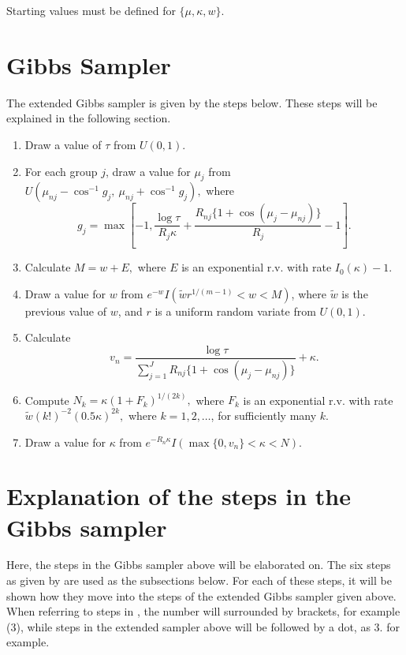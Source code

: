 \documentclass[12pt,a4paper]{article}
\begin{document}
Starting values must be defined for $\{\mu, \kappa, w\}$.

\section{Gibbs Sampler}

The extended Gibbs sampler is given by the steps below. These steps will be explained in the following section.

\begin{enumerate}
\item  Draw a value of $\tau$ from $U(0, 1)$. 

\item  For each group $j$, draw a value for $\mu_j$ from $U(\mu_{nj} - \cos^{-1}g_j,~ \mu_{nj} + \cos^{-1}g_j),$ where $$ g_j=\max\left[-1, \frac{\log \tau}{R_j \kappa} + \frac{ R_{nj} \{ 1 + \cos (\mu_j - \mu_{nj} ) \} } {R_{j}} - 1 \right]. $$

\item Calculate $ M = w + E,$ where $E$ is an exponential r.v. with rate $I_0(\kappa) - 1$.

\item  Draw a value for $w$ from $e^{-w} I(\tilde{w}r^{1/(m-1)} < w < M)$, where $\tilde{w}$ is the previous value of $w$, and $r$ is a uniform random variate from $U(0,1)$. 

\item  Calculate
$$ v_n = \frac{\log \tau}{\sum_{j=1}^{J} R_{nj} \{1+\cos(\mu_j - \mu_{nj}) \} } + \kappa.$$

\item Compute $ N_k = \kappa (1 + F_k)^{1/(2k)},$ where $F_k$ is an exponential r.v. with rate $\tilde{w}(k!)^{-2} (0.5\kappa )^{2k},$ where $k = 1, 2, \dots$, for sufficiently many $k$.

\item  Draw a value for $\kappa$ from $e^{-R_n\kappa} I( \max\{0, v_n\} < \kappa < N).$ 
\end{enumerate} 


\section{Explanation of the steps in the Gibbs sampler}

Here, the steps in the Gibbs sampler above will be elaborated on. The six steps as given by \citet{damien1999fullbayes} are used as the subsections below. For each of these steps, it will be shown how they move into the steps of the extended Gibbs sampler given above. When referring to steps in \citet{damien1999fullbayes}, the number will surrounded by brackets, for example (3), while steps in the extended sampler above will be followed by a dot, as 3. for example. 
\end{document}
